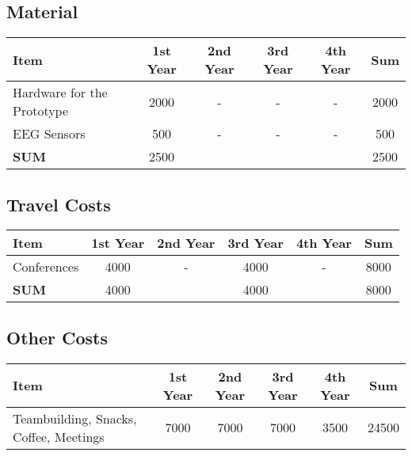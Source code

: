 \subsection{Material}
\begin{tabular}{|l|c|c|c|c|c|}
\hline 
Item & 1st Year & 2nd Year & 3rd Year & 4th Year & Sum \\ 
\hline 
Hardware for the Prototype & 2000 & - & - & - & 2000 \\ 
\hline 
EEG Sensors & 500 & - & - & - & 500 \\ 
\hline 
\textbf{SUM} & 2500 &  &  &  & 2500 \\ 
\hline 
\end{tabular} 

\subsection{Travel Costs}
\begin{tabular}{|l|c|c|c|c|c|}
\hline 
Item & 1st Year & 2nd Year & 3rd Year & 4th Year & Sum \\ 
\hline 
Conferences & 4000 & - & 4000 & - & 8000 \\ 
\hline 
\textbf{SUM} & 4000 &  & 4000 &  & 8000 \\ 
\hline 
\end{tabular} 

\subsection{Other Costs}
\begin{tabular}{|l|c|c|c|c|c|}
\hline 
Item & 1st Year & 2nd Year & 3rd Year & 4th Year & Sum \\ 
\hline 
Teambuilding, Snacks, Coffee, Meetings & 7000 & 7000 & 7000 & 3500 & 24500 \\
\hline 
\end{tabular} 

